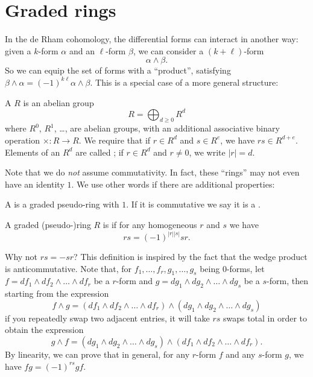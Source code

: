 \section{Graded rings}
In the de Rham cohomology, the differential forms can interact in another way:
given a $k$-form $\alpha$ and an $\ell$-form $\beta$, we can consider
a $(k+\ell)$-form
\[ \alpha \wedge \beta. \]
So we can equip the set of forms with a ``product'', satisfying
$\beta \wedge \alpha = (-1)^{k\ell} \alpha \wedge \beta$.
This is a special case of a more general structure:

\begin{definition}
	A  $R$ is an abelian group
	\[ R = \bigoplus_{d \ge 0} R^d \]
	where $R^0$, $R^1$, \dots, are abelian groups,
	with an additional associative binary operation $\times \colon R \to R$.
	We require that if $r \in R^d$ and $s \in R^e$, we have $rs \in R^{d+e}$.
	Elements of an $R^d$ are called ;
	if $r \in R^d$ and $r \neq 0$, we write $|r| = d$.
\end{definition}
Note that we do \emph{not} assume commutativity.
In fact, these ``rings'' may not even have an identity $1$.
We use other words if there are additional properties:
\begin{definition}
	\label{def:graded_ring}
	A  is a graded pseudo-ring with $1$.
	If it is commutative we say it is a .
\end{definition}
\begin{definition}
	A graded (pseudo-)ring $R$ is  if
	for any homogeneous $r$ and $s$ we have
	\[ rs = (-1)^{|r| |s|} sr. \]
\end{definition}

\begin{remark}
	Why not $rs = -sr$? This definition is inspired by the fact that the wedge product is
	anticommutative. Note that, for $f_1, \dots, f_r, g_1, \dots, g_s$ being $0$-forms,
	let $f = df_1 \wedge df_2 \wedge \dots \wedge df_r$ be a $r$-form and
	$g = dg_1 \wedge dg_2 \wedge \dots \wedge dg_s$ be a $s$-form,
	then starting from the expression
	\[ f \wedge g = (df_1 \wedge df_2 \wedge \dots \wedge df_r) \wedge
	(dg_1 \wedge dg_2 \wedge \dots \wedge dg_s) \]
	if you repeatedly swap two adjacent entries, it will take $rs$ swaps total in order to obtain
	the expression
	\[ g \wedge f = (dg_1 \wedge dg_2 \wedge \dots \wedge dg_s) \wedge
	(df_1 \wedge df_2 \wedge \dots \wedge df_r). \]
	By linearity, we can prove that in general, for any $r$-form $f$ and any $s$-form $g$,
	we have $fg = (-1)^{rs} gf$.
\end{remark}

